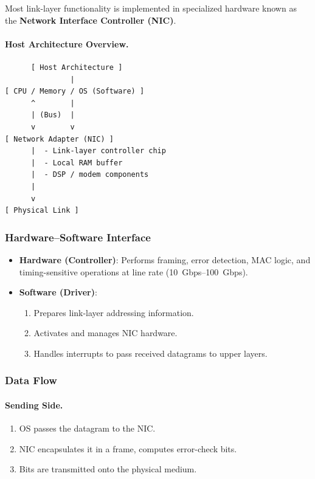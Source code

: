 \documentclass[12pt]{article}
\begin{document}
Most link-layer functionality is implemented in specialized hardware known as the \textbf{Network Interface Controller (NIC)}.

\paragraph{Host Architecture Overview.}

\begin{verbatim}
      [ Host Architecture ]
               |
[ CPU / Memory / OS (Software) ]
      ^        |
      | (Bus)  |
      v        v
[ Network Adapter (NIC) ]
      |  - Link-layer controller chip
      |  - Local RAM buffer
      |  - DSP / modem components
      |
      v
[ Physical Link ]
\end{verbatim}

\subsubsection{Hardware–Software Interface}

\begin{itemize}
    \item \textbf{Hardware (Controller)}:
          Performs framing, error detection, MAC logic, and timing-sensitive operations at line rate (10~Gbps--100~Gbps).
    \item \textbf{Software (Driver)}:
          \begin{enumerate}
              \item Prepares link-layer addressing information.
              \item Activates and manages NIC hardware.
              \item Handles interrupts to pass received datagrams to upper layers.
          \end{enumerate}
\end{itemize}

\subsubsection{Data Flow}

\paragraph{Sending Side.}
\begin{enumerate}
    \item OS passes the datagram to the NIC.
    \item NIC encapsulates it in a frame, computes error-check bits.
    \item Bits are transmitted onto the physical medium.
\end{enumerate}
\end{document}
